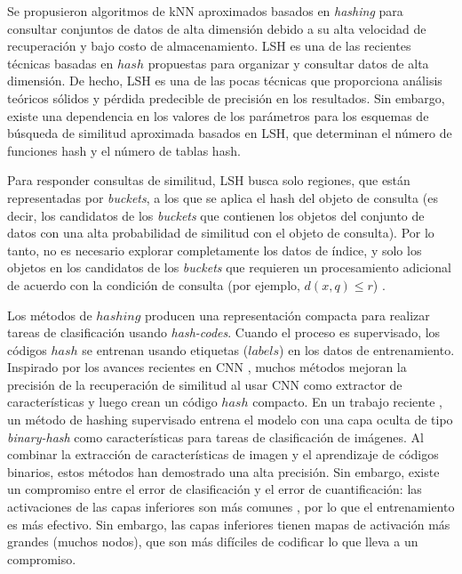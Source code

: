 Se propusieron algoritmos de kNN aproximados basados en \textit{hashing} para consultar conjuntos de datos de alta dimensión debido a su alta velocidad de recuperación y bajo costo de almacenamiento. \acf{LSH} \cite{lsh} es una de las recientes técnicas basadas en $hash$ propuestas para organizar y consultar datos de alta dimensión. De hecho, LSH es una de las pocas técnicas que proporciona análisis teóricos sólidos y pérdida predecible de precisión en los resultados. Sin embargo, existe una dependencia en los valores de los parámetros para los esquemas de búsqueda de similitud aproximada basados en LSH, que determinan el número de funciones hash y el número de tablas hash.

Para responder consultas de similitud, \ac{LSH} busca solo regiones, que están representadas por \textit{buckets}, a los que se aplica el hash del objeto de consulta (es decir, los candidatos de los \textit{buckets}  que contienen los objetos del conjunto de datos con una alta probabilidad de similitud con el objeto de consulta). Por lo tanto, no es necesario explorar completamente los datos de índice, y solo los objetos en los candidatos de los \textit{buckets}  que requieren un procesamiento adicional de acuerdo con la condición de consulta (por ejemplo, $ d(x,q) \leq r $) \cite{DBLP:journals/jidm/OcsaS10}.

Los métodos de $hashing$ producen una representación compacta  para realizar   tareas de clasificación usando \textit{hash-codes}. Cuando el proceso es supervisado, los códigos $hash$ se entrenan usando etiquetas ($labels$) en los datos de entrenamiento. Inspirado por los avances recientes en \acf{CNN} \cite{ImageNet}, muchos métodos mejoran la precisión de la recuperación de similitud al usar CNN como extractor de características y luego crean un código $hash$ compacto. En un trabajo reciente \cite{kLin:DH}, un método de hashing supervisado entrena el modelo con una capa oculta de tipo \textit{binary-hash} como características para tareas de clasificación de imágenes. Al combinar la extracción de características de imagen y el aprendizaje de códigos binarios, estos métodos han demostrado una alta precisión. Sin embargo, existe un compromiso entre el error de clasificación y el error de cuantificación: las activaciones de las capas inferiores son más comunes \cite{DBLP:journals/corr/YosinskiCBL14}, por lo que el entrenamiento es más efectivo. Sin embargo, las capas inferiores tienen mapas de activación más grandes (muchos nodos), que son más difíciles de codificar lo que lleva a un compromiso.


